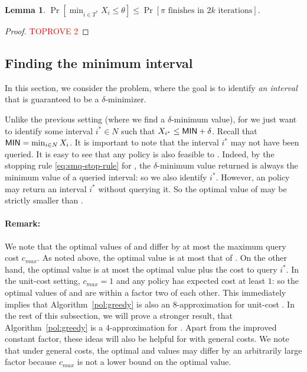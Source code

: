 \documentclass[11pt]{article}
\newtheorem{lem}[thm]{Lemma}
\theoremstyle{remark}
\theoremstyle{plain}
\theoremstyle{remark}
\begin{document}
\noindent
\begin{lem} 
\label{lem:lbalg} $\Pr\left[\min_{i \in T^*} X_i  \le  \theta\right] \leq \Pr[\pi \text{ finishes in }2k \text{ iterations}] $. \end{lem}

\begin{proof}\textcolor{red}{TOPROVE 2}\end{proof}


\noindent




\subsection{Finding the minimum interval}
\label{subsec:unit-smqi} 
In this section, we consider the \smqi problem,   where the goal is to identify  \emph{an interval} that is guaranteed to be a $\delta$-minimizer. 

Unlike the previous \smq setting (where we find a  $\delta$-minimum value), for \smqi  we just want to identify some interval $i^*\in N$ such that $X_{i^*}\le {\sf MIN} +\delta$. Recall that ${\sf MIN}=\min_{i\in N} X_i$. It is important to note that the interval $i^*$ may not have been queried.  It is easy to see that any \smq policy is also feasible to \smqi. Indeed, by the stopping rule \eqref{eq:smq-stop-rule} for \smq, the $\delta$-minimum value returned is always the minimum value of a queried interval: so we also identify $i^*$. However, an \smqi policy may return an interval $i^*$ without querying it. So the optimal value of \smqi may be strictly smaller than \smq. 

\paragraph{Remark:} We note that the optimal values of \smq and \smqi differ by at most the maximum query cost $c_{max}$. As noted above, the optimal \smqi value is at most that of \smq. On the other hand, the optimal \smq value is at most the optimal \smqi value plus the cost to query $i^*$. In the unit-cost setting, $c_{max}=1$ and any policy has expected cost at least $1$: so  the optimal  values of \smq and \smqi are within a factor two of each other.  This immediately implies that Algorithm~\ref{pol:greedy}  is also  an $8$-approximation   for unit-cost \smqi. In the rest of this subsection,  we will prove a stronger result, that  Algorithm~\ref{pol:greedy}  is a $4$-approximation for \smqi. Apart from the improved constant factor, these ideas  will also be helpful for \smqi with general costs. We note that under general costs, the optimal \smq and \smqi values may differ by an arbitrarily large factor because $c_{max}$ is not a lower bound on the optimal value.
\end{document}
